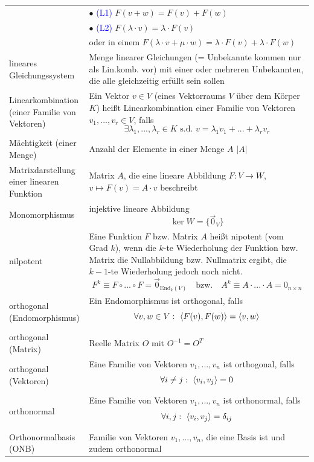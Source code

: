 \documentclass{article}
\begin{document}
\begin{xltabular}{\linewidth}{p{0.33\textwidth}|X}
			& $\bullet$ \textcolor{blue}{(L1)} $F(v + w) = F(v) + F(w)$ \\
			& $\bullet$ \textcolor{blue}{(L2)} $F(\lambda\cdot v) = \lambda\cdot F(v)$ \\
			& {\color{gruen} oder in einem $F(\lambda\cdot v + \mu\cdot w) = \lambda\cdot F(v) + \lambda\cdot F(w)$} \\
	\hline
		lineares Gleichungssystem & Menge linearer Gleichungen \textcolor{gruen}{(= Unbekannte kommen nur als Lin.komb. vor)} mit einer oder mehreren Unbekannten, die alle gleichzeitig erfüllt sein sollen \\
	\hline
		Linearkombination (einer Familie von Vektoren) & Ein Vektor $v\in V$ \textcolor{gruen}{(eines Vektorraums $V$ über dem Körper $K$)} heißt Linearkombination einer Familie von Vektoren $v_1,...,v_r\in V$, falls
			$$\exists \lambda_1, ..., \lambda_r \in K \text{ s.d. } v = \lambda_1 v_1 + ... + \lambda_r v_r$$ \\
	\hline
		Mächtigkeit (einer Menge) & Anzahl der Elemente in einer Menge $A$ $|A|$ \\
	\hline
		Matrixdarstellung einer linearen Funktion & Matrix $A$, die eine lineare Abbildung $F:V\to W$, $v\mapsto F(v) = A\cdot v$ beschreibt \\
	\hline
		Monomorphismus & injektive lineare Abbildung
			$$\ker W = \{\vec{0}_V\}$$ \\
	\hline
		nilpotent & Eine Funktion $F$ bzw. Matrix $A$ heißt nipotent (vom Grad $k$), wenn die $k$-te Wiederholung der Funktion bzw. Matrix die Nullabbildung bzw. Nullmatrix ergibt, die $k-1$-te Wiederholung jedoch noch nicht.
		$$F^k\equiv F\circ ...\circ F = \vec{0}_{\text{End}_k(V)} \quad\text{bzw.}\quad A^k\equiv A\cdot ...\cdot A = 0_{n\times n}$$ \\
	\hline
		orthogonal (Endomorphismus) & Ein Endomorphismus ist orthogonal, falls 
			$$\forall v,w\in V:\ \braket{F(v),F(w)} = \braket{v,w}$$ \\
	\hline
		orthogonal (Matrix) & Reelle Matrix $O$ mit $O^{-1}=O^T$ \\
	\hline
		orthogonal (Vektoren) & Eine Familie von Vektoren $v_1,...,v_n$ ist orthogonal, falls
			$$\forall i\neq j:\ \braket{v_i,v_j} = 0$$ \\
	\hline
		orthonormal & Eine Familie von Vektoren $v_1,...,v_n$ ist orthonormal, falls
		$$\forall i,j:\ \braket{v_i,v_j} = \delta_{ij}$$ \\
	\hline
		Orthonormalbasis (ONB) & Familie von Vektoren $v_1,...,v_n$, die eine Basis ist und zudem orthonormal \\

\end{xltabular}
\end{document}
